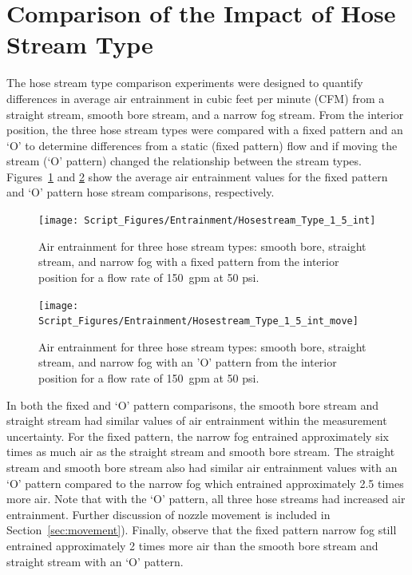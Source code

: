\documentclass[12pt,oneside]{book}
\begin{document}
\section{Comparison of the Impact of Hose Stream Type}

The hose stream type comparison experiments were designed to quantify differences in average air entrainment in cubic feet per minute (CFM) from a straight stream, smooth bore stream, and a narrow fog stream. From the interior position, the three hose stream types were compared with a fixed pattern and an `O' to determine differences from a static (fixed pattern) flow and if moving the stream (`O' pattern) changed the relationship between the stream types. Figures~\ref{fig:hosestream_type} and \ref{fig:hosestream_type_o} show the average air entrainment values for the fixed pattern and `O' pattern hose stream comparisons, respectively.

\begin{figure}[!ht]
	\centering
	\texttt{[image: Script\_Figures/Entrainment/Hosestream\_Type\_1\_5\_int]}
	\caption[Air Entrainment Comparison of Hose Stream Type Fixed Pattern]{Air entrainment for three hose stream types: smooth bore, straight stream, and narrow fog with a fixed pattern from the interior position for a flow rate of 150~gpm at 50 psi.}
	\label{fig:hosestream_type}
\end{figure}

\begin{figure}[!ht]
	\centering
	\texttt{[image: Script\_Figures/Entrainment/Hosestream\_Type\_1\_5\_int\_move]}
	\caption[Air Entrainment Comparison of Hose Stream Type 'O' Pattern]{Air entrainment for three hose stream types: smooth bore, straight stream, and narrow fog with an 'O' pattern from the interior position for a flow rate of 150~gpm at 50 psi.}
	\label{fig:hosestream_type_o}
\end{figure}


In both the fixed and `O' pattern comparisons, the smooth bore stream and straight stream had similar values of air entrainment within the measurement uncertainty. For the fixed pattern, the narrow fog entrained approximately six times as much air as the straight stream and smooth bore stream. The straight stream and smooth bore stream also had similar air entrainment values with an `O' pattern compared to the narrow fog which entrained approximately 2.5 times more air. Note that with the `O' pattern, all three hose streams had increased air entrainment. Further discussion of nozzle movement is included in Section~\ref{sec:movement}). Finally, observe that the fixed pattern narrow fog still entrained approximately 2 times more air than the smooth bore stream and straight stream with an `O' pattern.
\end{document}
